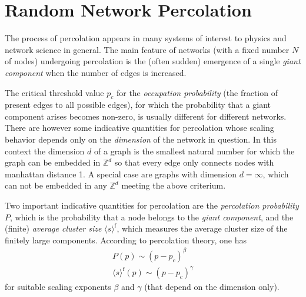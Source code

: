 \documentclass{scrartcl}
\begin{document}
\clearpage
\clearpage


\section{Random Network Percolation}
The process of percolation appears in many systems of interest to physics
and network science in general. The main feature of networks (with a fixed
number $N$ of nodes) undergoing percolation is the (often sudden) emergence
of a single \emph{giant component} when the number of edges is increased.

The critical threshold value $p_c$ for the \emph{occupation probability}
(the fraction of present edges to all possible edges), for which the
probability that a giant component arises becomes non-zero, is usually
different for different networks. There are however some indicative
quantities for percolation whose scaling behavior depends only on the
\emph{dimension} of the network in question. In this context the dimension $d$
of a graph is the smallest natural number for which the graph can be embedded in
$\mathbb{Z}^d$ so that every edge only connects nodes with manhattan distance 1.
A special case are graphs with dimension $d=\infty$, which can not be embedded in any
$\mathbb{Z}^d$ meeting the above criterium.

Two important indicative quantities for percolation are the
\emph{percolation probability} $P$, which is the probability that a node
belongs to the \emph{giant component}, and the (finite) \emph{average
cluster size} $\langle s \rangle^\mathrm{f}$, which measures the average
cluster size of the finitely large components. According to percolation theory, one has
\begin{equation}\label{eq:coefficients}
\begin{aligned}
    P(p) \sim (p - p_c)^\beta \\
    \langle s \rangle^\mathrm{f}(p) \sim (p - p_c)^\gamma
\end{aligned}
\end{equation}
for suitable scaling exponents $\beta$ and $\gamma$ (that depend on the dimension only).
\end{document}
